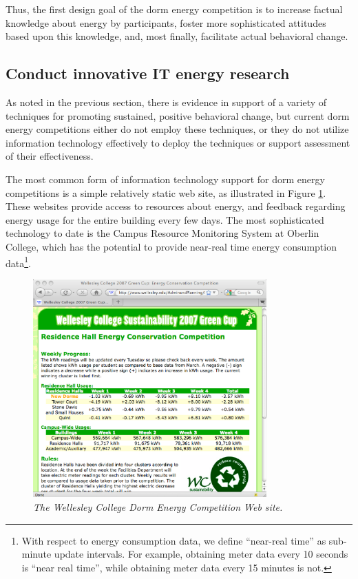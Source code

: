 \documentclass[11pt]{article}
\begin{document}
Thus, the first design goal of the dorm energy competition is to increase
factual knowledge about energy by participants, foster more sophisticated
attitudes based upon this knowledge, and, most finally, facilitate actual
behavioral change.


\subsection{Conduct innovative IT energy research}

As noted in the previous section, there is evidence in support of a variety
of techniques for promoting sustained, positive behavioral change, but
current dorm energy competitions either do not employ these techniques, or
they do not utilize information technology effectively to deploy the
techniques or support assessment of their effectiveness.

The most common form of information technology support for dorm energy
competitions is a simple relatively static web site, as illustrated in
Figure \ref{fig:wellesley}.  These websites provide access to resources
about energy, and feedback regarding energy usage for the entire building
every few days.  The most sophisticated technology to date is the Campus
Resource Monitoring System at Oberlin College, which has the potential to
provide near-real time energy consumption data\footnote{With respect to
  energy consumption data, we define ``near-real time'' as sub-minute
  update intervals.  For example, obtaining meter data every 10 seconds is
  ``near real time'', while obtaining meter data every 15 minutes is not.}.

\begin{figure}[!ht]
  \center
  \includegraphics[width=0.8\textwidth]{wellesley.ppt.eps}
  \caption{\em \small The Wellesley College Dorm Energy Competition Web site.}
 \label{fig:wellesley}
\end{figure} 
\end{document}
